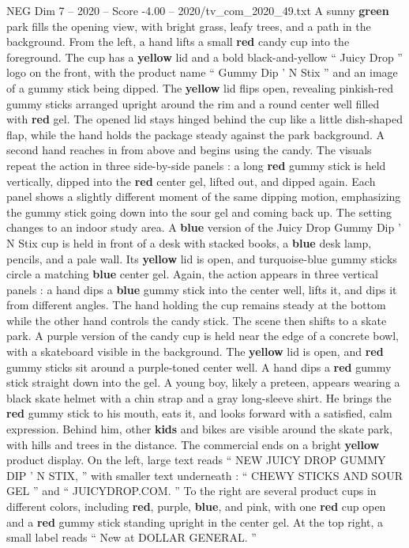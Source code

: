 \begin{textsample}{NEG Dim 7 – 2020 – Score -4.00 – 2020/tv\_com\_2020\_49.txt}  \label{ex:f7_neg_007}
A sunny \textbf{green} park fills the opening view, with bright grass, leafy trees, and a path in the background.
From the left, a hand lifts a small \textbf{red} candy cup into the foreground.
The cup has a \textbf{yellow} lid and a bold black-and-yellow “ Juicy Drop ” logo on the front, with the product name “ Gummy Dip ’ N Stix ” and an image of a gummy stick being dipped.
The \textbf{yellow} lid flips open, revealing pinkish-red gummy sticks arranged upright around the rim and a round center well filled with \textbf{red} gel.
The opened lid stays hinged behind the cup like a little dish-shaped flap, while the hand holds the package steady against the park background.
A second hand reaches in from above and begins using the candy.
The visuals repeat the action in three side-by-side panels : a long \textbf{red} gummy stick is held vertically, dipped into the \textbf{red} center gel, lifted out, and dipped again.
Each panel shows a slightly different moment of the same dipping motion, emphasizing the gummy stick going down into the sour gel and coming back up.
The setting changes to an indoor study area.
A \textbf{blue} version of the Juicy Drop Gummy Dip ’ N Stix cup is held in front of a desk with stacked books, a \textbf{blue} desk lamp, pencils, and a pale wall.
Its \textbf{yellow} lid is open, and turquoise-blue gummy sticks circle a matching \textbf{blue} center gel.
Again, the action appears in three vertical panels : a hand dips a \textbf{blue} gummy stick into the center well, lifts it, and dips it from different angles.
The hand holding the cup remains steady at the bottom while the other hand controls the candy stick.
The scene then shifts to a skate park.
A purple version of the candy cup is held near the edge of a concrete bowl, with a skateboard visible in the background.
The \textbf{yellow} lid is open, and \textbf{red} gummy sticks sit around a purple-toned center well.
A hand dips a \textbf{red} gummy stick straight down into the gel.
A young boy, likely a preteen, appears wearing a black skate helmet with a chin strap and a gray long-sleeve shirt.
He brings the \textbf{red} gummy stick to his mouth, eats it, and looks forward with a satisfied, calm expression.
Behind him, other \textbf{kids} and bikes are visible around the skate park, with hills and trees in the distance.
The commercial ends on a bright \textbf{yellow} product display.
On the left, large text reads “ NEW JUICY DROP GUMMY DIP ’ N STIX, ” with smaller text underneath : “ CHEWY STICKS AND SOUR GEL ” and “ JUICYDROP.COM. ” To the right are several product cups in different colors, including \textbf{red}, purple, \textbf{blue}, and pink, with one \textbf{red} cup open and a \textbf{red} gummy stick standing upright in the center gel.
At the top right, a small label reads “ New at DOLLAR GENERAL. ”

\end{textsample}
